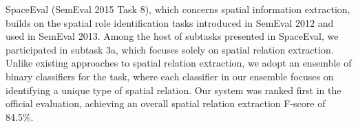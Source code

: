 SpaceEval (SemEval 2015 Task 8), which concerns spatial information extraction, builds on the spatial role identification tasks introduced in SemEval 2012 and used in SemEval 2013. Among the host of subtasks presented in SpaceEval, we participated in subtask 3a, which focuses solely on spatial relation extraction. Unlike existing approaches to spatial relation extraction, we adopt an ensemble of binary classifiers for the task, where each classifier in our ensemble focuses on identifying a unique type of spatial relation. Our system was ranked first in the official evaluation, achieving an overall spatial relation extraction F-score of 84.5\%.
